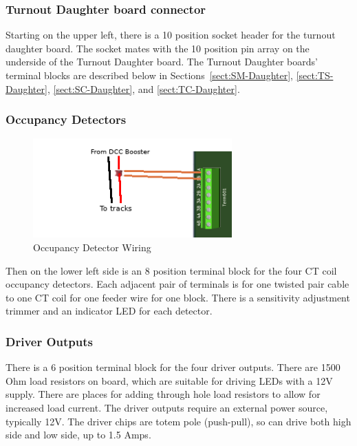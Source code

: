 \documentclass[12pt,twoside]{article}
\begin{document}
\subsubsection{Turnout Daughter board connector}

Starting on the upper left, there is a 10 position socket header for the 
turnout daughter board.  The socket mates with the 10 position pin array on 
the underside of the Turnout Daughter board.  The Turnout Daughter boards' 
terminal blocks are described below in Sections~\ref{sect:SM-Daughter}, 
\ref{sect:TS-Daughter}, \ref{sect:SC-Daughter}, and \ref{sect:TC-Daughter}.

\clearpage
\subsubsection{Occupancy Detectors}
\begin{figure}[hbpt]\begin{centering}%
\includegraphics[height=1.5in]{OccupancyDetector-Wiring.png}
\caption{Occupancy Detector Wiring}
\end{centering}\end{figure} 

Then on the lower left side is an 8 position terminal block for the four CT 
coil occupancy detectors.  Each adjacent pair of terminals is for one twisted 
pair cable to one CT coil for one feeder wire for one block. There is a 
sensitivity adjustment trimmer and an indicator LED for each detector.

\subsubsection{Driver Outputs}

There is a 6 position terminal block for the four driver outputs. There are
1500 Ohm load resistors on board, which are suitable for driving LEDs with a
12V supply. There are places for adding through hole load resistors to allow
for increased load current. The driver outputs require an external power
source, typically 12V. The driver chips are totem pole (push-pull), so can
drive both high side and low side, up to 1.5 Amps.
\end{document}
